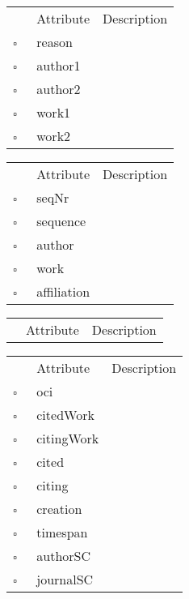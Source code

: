 \begin{table}
\caption{AuthorDouble  }

\begin{longtable}{llp{8cm}}
& Attribute & Description \\
$\square$\ & reason &  \\
$\square$\ & author1 &  \\
$\square$\ & author2 &  \\
$\square$\ & work1 &  \\
$\square$\ & work2 &  \\
\end{longtable}
\label{attr:AuthorDouble}
\end{table}

\begin{table}
\caption{Authorship  }

\begin{longtable}{llp{8cm}}
& Attribute & Description \\
$\square$\ & seqNr &  \\
$\square$\ & sequence &  \\
$\square$\ & author &  \\
$\square$\ & work &  \\
$\square$\ & affiliation &  \\
\end{longtable}
\label{attr:Authorship}
\end{table}

\clearpage
\begin{table}
\caption{Book  }

\begin{longtable}{llp{8cm}}
& Attribute & Description \\
\end{longtable}
\label{attr:Book}
\end{table}

\begin{table}
\caption{Citation  }

\begin{longtable}{llp{8cm}}
& Attribute & Description \\
$\square$\ & oci &  \\
$\square$\ & citedWork &  \\
$\square$\ & citingWork &  \\
$\square$\ & cited &  \\
$\square$\ & citing &  \\
$\square$\ & creation &  \\
$\square$\ & timespan &  \\
$\square$\ & authorSC &  \\
$\square$\ & journalSC &  \\
\end{longtable}
\label{attr:Citation}
\end{table}

